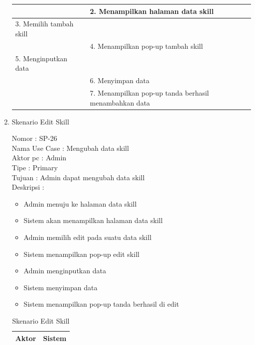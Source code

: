 \begin{enumerate}
\begin{table}
\begin{tabular}{ | l | p{65mm} |}
		\hline
		
		&  2.	Menampilkan halaman data skill \\
		
		\hline
		
		3. Memilih tambah skill & \\
		
		\hline
		
		& 4.	Menampilkan pop-up tambah skill \\
		
		\hline
		
		5.	Menginputkan data  & \\
		\hline
		
		& 6.	Menyimpan data \\
		\hline
		
		& 7.	Menampilkan pop-up tanda berhasil menambahkan data \\
		\hline
		
	\end{tabular}
\end{table}

\item Skenario Edit Skill

Nomor \kern 3.6pc : SP-26 \\
Nama Use Case : Mengubah data skill \\
Aktor  pc : Admin \\
Tipe \kern 4.6pc : Primary \\
Tujuan \kern 3.6pc : Admin dapat mengubah data skill \\
Deskripsi \kern 2.5pc : 

\begin{itemize}
	\item Admin menuju ke halaman data skill
	\item Sistem akan menampilkan halaman data skill
	\item Admin memilih edit pada suatu data skill
	\item Sistem menampilkan pop-up edit skill
	\item Admin menginputkan data
	\item Sistem menyimpan data
	\item Sistem menampilkan pop-up tanda berhasil di edit
	
\end{itemize}

\begin{table}
	\caption{Skenario Edit Skill}
	\centering
	\begin{tabular}{ | l | p{60mm} |}
		\hline 
		\textbf{Aktor} & \textbf{Sistem} \\
		\hline
		

\end{tabular}
\end{table}
\end{enumerate}
